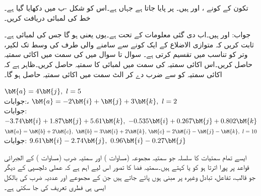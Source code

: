 تکون کے کونے ،  اور  ہیں۔ پر  پایا جاتا ہے جہاں
  ہے۔اس کو شکل -ب میں دکھایا گیا ہے۔خط  کی لمبائی دریافت کریں۔

جواب: اور  ہیں۔اب دی گئی معلومات کے تحت  ہے۔یوں  یعنی  ہو گا جس کی لمبائی  ہے۔
ثابت کریں کہ متوازی الاضلاع کے ایک کونے سے سامنے والی طرف کی وسط تک لکیر، وتر کو  تناسب میں تقسیم کرتی ہے۔
سوال  تا سوال  میں  کی سمت میں اکائی سمتیہ حاصل کریں۔اس اکائی سمتیہ کی سمت میں  لمبائی کا سمتیہ حاصل کریں۔ظاہر ہے کہ اکائی سمتیہ کو  سے ضرب دے کر الٹ سمت میں اکائی سمتیہ حاصل ہو گا۔ 

\quad  
$\bM{a}=4\bM{j},\,\,  l=5$\\
جوابات:، 
\quad  
$\bM{a}=-2\bM{i}+\bM{j}+3\bM{k},\,\, l=2$\\
جوابات:
$-3.74\bM{i}+1.87\bM{j}+5.61\bM{k},\,\,-0.535\bM{i}+0.267\bM{j}+0.802\bM{k}$
\quad  
$\bM{a}=\bM{b}+2\bM{c},\,\,\bM{b}=3\bM{i}+2\bM{k},\, \bM{c}=2\bM{i}-\bM{j}-\bM{k},\,\,  l=10$\\
جوابات:
$9.61\bM{i}-2.74\bM{j},\,\,0.96\bM{i}-0.27\bM{j}$

ایسے تمام سمتیات کا سلسلہ  جو سمتیہ مجموعہ (مساوات ) اور سمتیہ ضرب (مساوات ) کے الجبرائی قواعد پر پورا اترتا ہو کو  یا   کہتے ہیں۔سمتیہ فضا کا تصور اس لیے اہم ہے کہ عملی دلچسپی کے دیگر   جو قالب، تفاعل، تبادل وغیرہ پر مبنی ہوں پائے جاتے ہیں جن کے مجموعے اور عددیہ ضرب کی بالکل ایسی ہی فطری  تعریف کی جا سکتی ہے۔      

